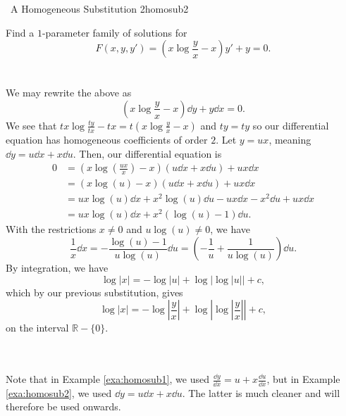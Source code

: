         \begin{example}{\Difficulty\,\Difficulty\,\,A Homogeneous Substitution 2}{homosub2}
            
            Find a \(1\)-parameter family of solutions for 
            \begin{equation*}
                F(x,y,y')=\left(x\log\frac{y}{x}-x\right)y'+y=0.
            \end{equation*}
            \\
            \\
            We may rewrite the above as
            \begin{equation*}
                \left(x\log\frac{y}{x}-x\right)\dd y+y\dd x=0.
            \end{equation*}
            We see that \(tx\log\frac{ty}{tx}-tx=t\left(x\log\frac{y}{x}-x\right)\) and \(ty=ty\) so our differential equation has homogeneous coefficients of order \(2\). Let \(y=ux\), meaning \(\dd y=u\dd x+x\dd u\). Then, our differential equation is
            \begin{align*}
                0&=\left(x\log\left(\frac{ux}{x}\right)-x\right)(u\dd x+x\dd u)+ux\dd x \\
                &=\left(x\log\left(u\right)-x\right)(u\dd x+x\dd u)+ux\dd x \\
                &=ux\log(u)\dd x+x^2\log(u)\dd u-ux\dd x-x^2\dd u+ux\dd x \\
                &=ux\log(u)\dd x+x^2(\log(u)-1)\dd u.
            \end{align*}
            With the restrictions \(x\neq0\) and \(u\log(u)\neq0\), we have
            \begin{equation*}
                \frac{1}{x}\dd x=-\frac{\log(u)-1}{u\log(u)}\dd u=\left(-\frac{1}{u}+\frac{1}{u\log(u)}\right)\dd u.
            \end{equation*}
            By integration, we have
            \begin{equation*}
                \log|x|=-\log|u|+\log|\log|u||+c,
            \end{equation*}
            which by our previous substitution, gives
            \begin{equation*}
                \log|x|=-\log\left|\frac{y}{x}\right|+\log\left|\log\left|\frac{y}{x}\right|\right|+c,
            \end{equation*}
            on the interval \(\mathbb{R}-\{0\}\).
        \end{example}
        \vphantom
        \\
        \\
        Note that in Example \ref{exa:homosub1}, we used \(\frac{\dd y}{\dd x}=u+x\frac{\dd u}{\dd x}\), but in Example \ref{exa:homosub2}, we used \(\dd y=u\dd x+x\dd u\). The latter is much cleaner and will therefore be used onwards.

